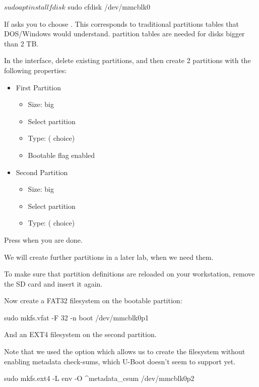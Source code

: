 \begin{bashinput}
$ sudo apt install fdisk
$ sudo cfdisk /dev/mmcblk0
\end{bashinput}


If  asks you to  choose .
This corresponds to traditional partitions tables that DOS/Windows would 
understand.  partition tables are needed for disks bigger than 2 TB.

In the  interface, delete existing partitions, and then create 2
partitions with the following properties:

\begin{itemize}
\item First Partition
\begin{itemize}
  \item Size:  big
  \item Select  partition
  \item Type:   ( choice)
  \item Bootable flag enabled
\end{itemize}

\item Second Partition
\begin{itemize}
  \item Size:  big
  \item Select  partition
  \item Type:   ( choice)
\end{itemize}
\end{itemize}

Press  when you are done.

We will create further partitions in a later lab, when we need them.

To make sure that partition definitions are reloaded on your
workstation, remove the SD card and insert it again.

Now create a FAT32 filesystem on the bootable partition:
\begin{bashinput}
sudo mkfs.vfat -F 32 -n boot /dev/mmcblk0p1
\end{bashinput}

And an EXT4 filesystem on the second partition.

Note that we used the  option which allows us to create
the filesystem without enabling metadata check-sums, which U-Boot doesn't
seem to support yet.
\begin{bashinput}
sudo mkfs.ext4 -L env -O ^metadata_csum /dev/mmcblk0p2
\end{bashinput}


